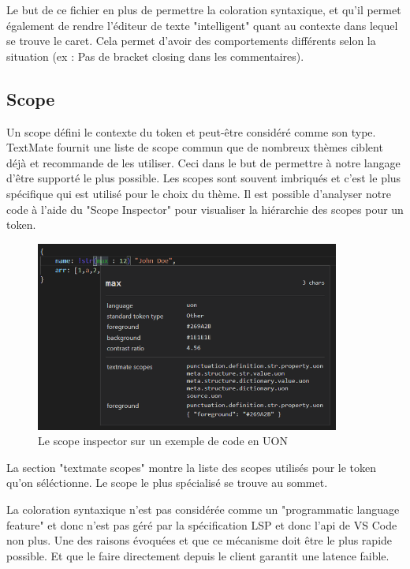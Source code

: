 \documentclass[
    iict, %
    il, %
]{heig-tb}
\begin{document}
Le but de ce fichier en plus de permettre la coloration syntaxique, et qu'il permet également de rendre l'éditeur de texte "intelligent" quant au contexte dans lequel se trouve le caret. Cela permet d'avoir des comportements différents selon la situation (ex : Pas de bracket closing dans les commentaires).

\subsection{Scope}
Un scope défini le contexte du token et peut-être considéré comme son type.
TextMate fournit une liste de scope commun que de nombreux thèmes ciblent déjà et recommande de les utiliser. Ceci dans le but de permettre à notre langage d'être supporté le plus possible.
Les scopes sont souvent imbriqués et c'est le plus spécifique qui est utilisé pour le choix du thème.
Il est possible d'analyser notre code à l'aide du "Scope Inspector" pour visualiser la hiérarchie des scopes pour un token.

\begin{figure}[!h]
    \begin{center}
        \includegraphics[width=10cm]{assets/figures/scope-inspector.png}
    \end{center}
    \caption[Scope inspector]{\label{basic-uon} Le scope inspector sur un exemple de code en UON}
\end{figure}

La section "textmate scopes" montre la liste des scopes utilisés pour le token qu'on séléctionne. Le scope le plus spécialisé se trouve au sommet.

La coloration syntaxique n'est pas considérée comme un "programmatic language feature" et donc n'est pas géré par la spécification LSP et donc l'api de VS Code non plus. Une des raisons évoquées et que ce mécanisme doit être le plus rapide possible. Et que le faire directement depuis le client garantit une latence faible.
\end{document}
